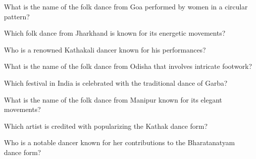 \documentclass[12pt,a4paper]{book}
\begin{document}
\begin{enhancedmcq}[Question 14]{What is the name of the folk dance from Goa performed by women in a circular pattern?}
\end{enhancedmcq}

\begin{enhancedmcq}[Question 15]{Which folk dance from Jharkhand is known for its energetic movements?}
\end{enhancedmcq}

\begin{enhancedmcq}[Question 16]{Who is a renowned Kathakali dancer known for his performances?}
\end{enhancedmcq}

\begin{enhancedmcq}[Question 17]{What is the name of the folk dance from Odisha that involves intricate footwork?}
\end{enhancedmcq}

\begin{enhancedmcq}[Question 18]{Which festival in India is celebrated with the traditional dance of Garba?}
\end{enhancedmcq}

\begin{enhancedmcq}[Question 19]{What is the name of the folk dance from Manipur known for its elegant movements?}
\end{enhancedmcq}

\begin{enhancedmcq}[Question 20]{Which artist is credited with popularizing the Kathak dance form?}
\end{enhancedmcq}

\begin{enhancedmcq}[Question 21]{Who is a notable dancer known for her contributions to the Bharatanatyam dance form?}
\end{enhancedmcq}
\end{document}
